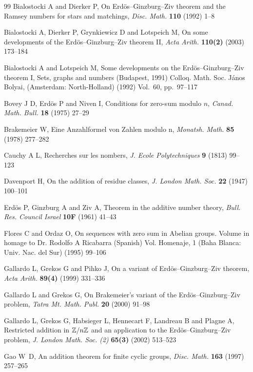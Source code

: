 \documentclass[fleqn]{mat01}
\begin{document}
\begin{thebibliography}{99}
 Bialostocki A and Dierker P, {On Erd\"{o}s--Ginzburg--Ziv
theorem and the Ramsey numbers for stars and matchings}, {\it Disc.
Math.} {\bf 110} (1992) 1--8

 Bialostocki A, Dierker P, Grynkiewicz D and Lotspeich M,
On some developments of the Erd\"{o}s--Ginzburg--Ziv theorem II, {\it
Acta Arith.} {\bf 110(2)} (2003) 173--184

 Bialostocki A and Lotspeich M, {Some developments on the
Erd\"{o}s--Ginzburg--Ziv theorem I}, Sets, graphs and numbers
(Budapest, 1991) Colloq. Math. Soc. J\'anos Bolyai,
(Amsterdam: North-Holland) (1992) Vol.~60, pp.~97--117

 Bovey J D, Erd\"{o}s P and Niven I, {Conditions for
zero-sum modulo $n$,} {\it Canad. Math. Bull.} {\bf 18} (1975) 27--29

 Brakemeier W, Eine Anzahlformel von Zahlen modulo n, {\it
Monatsh. Math.} {\bf 85} (1978) 277--282

 Cauchy A L, Recherches sur les nombers, {\it J. Ecole
Polytechniques} {\bf 9} (1813) 99--123

 Davenport H, On the addition of residue classes, {\it J.
London Math. Soc.} {\bf 22} (1947) 100--101

 Erd\"{o}s P, Ginzburg A and Ziv A, {Theorem in the additive
number theory}, {\it Bull. Res. Council Israel} {\bf 10F} (1961)
41--43

 Flores C and Ordaz O, On sequences with zero sum in
Abelian groups. Volume in homage to Dr. Rodolfo A Ricabarra (Spanish)
Vol. Homenaje, 1 (Baha Blanca: Univ. Nac. del Sur) (1995) 99--106

 Gallardo L, Grekos G and Pihko J, {On a variant of
Erd\"{o}s--Ginzburg--Ziv theorem}, {\it Acta Arith.} {\bf 89(4)} (1999)
331--336

 Gallardo L and Grekos G, {On Brakemeier's variant of the
Erd\"{o}s--Ginzburg--Ziv problem}, {\it Tatra Mt. Math. Publ.} {\bf 20}
(2000) 91--98

 Gallardo L, Grekos G, Habsieger L, Hennecart F,
Landreau B and Plagne A, {Restricted addition in $\Bbb Z/n\Bbb Z$ and an
application to the Erd\"{o}s--Ginzburg--Ziv problem}, {\it J. London
Math. Soc. (2)} {\bf 65(3)} (2002) 513--523

 Gao W~D, An addition theorem for finite cyclic groups,
{\it Disc. Math.} {\bf 163} (1997) 257--265


\end{thebibliography}
\end{document}
